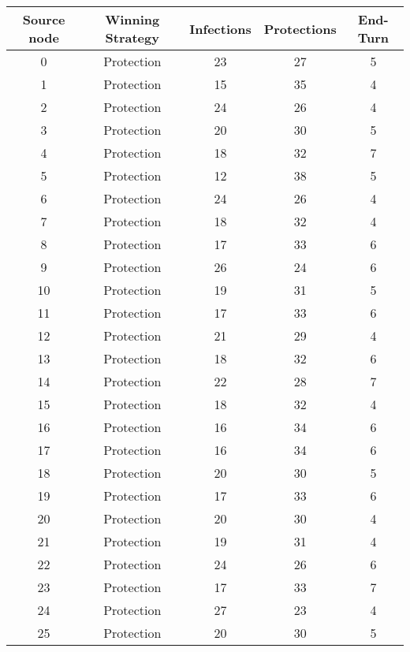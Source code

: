 \documentclass[results.tex]{subfiles}
\begin{document}
\begin{center}
  \begin{tabular}{| c || c | c | c | c |}
    \hline
    {\bfseries Source node} & {\bfseries Winning Strategy} & {\bfseries Infections} & {\bfseries Protections} & {\bfseries End-Turn} \\  %
    \hline\hline
    0 & Protection & 23 & 27 & 5 \\ 
    \hline
    1 & Protection & 15 & 35 & 4 \\ 
    \hline
    2 & Protection & 24 & 26 & 4 \\ 
    \hline
    3 & Protection & 20 & 30 & 5 \\ 
    \hline
    4 & Protection & 18 & 32 & 7 \\ 
    \hline
    5 & Protection & 12 & 38 & 5 \\ 
    \hline
    6 & Protection & 24 & 26 & 4 \\ 
    \hline
    7 & Protection & 18 & 32 & 4 \\ 
    \hline
    8 & Protection & 17 & 33 & 6 \\ 
    \hline
    9 & Protection & 26 & 24 & 6 \\ 
    \hline
    10 & Protection & 19 & 31 & 5 \\ 
    \hline
    11 & Protection & 17 & 33 & 6 \\ 
    \hline
    12 & Protection & 21 & 29 & 4 \\ 
    \hline
    13 & Protection & 18 & 32 & 6 \\ 
    \hline
    14 & Protection & 22 & 28 & 7 \\ 
    \hline
    15 & Protection & 18 & 32 & 4 \\ 
    \hline
    16 & Protection & 16 & 34 & 6 \\ 
    \hline
    17 & Protection & 16 & 34 & 6 \\ 
    \hline
    18 & Protection & 20 & 30 & 5 \\ 
    \hline
    19 & Protection & 17 & 33 & 6 \\ 
    \hline
    20 & Protection & 20 & 30 & 4 \\ 
    \hline
    21 & Protection & 19 & 31 & 4 \\ 
    \hline
    22 & Protection & 24 & 26 & 6 \\ 
    \hline
    23 & Protection & 17 & 33 & 7 \\ 
    \hline
    24 & Protection & 27 & 23 & 4 \\ 
    \hline
    25 & Protection & 20 & 30 & 5 \\ 

\end{tabular}
\end{center}
\end{document}
